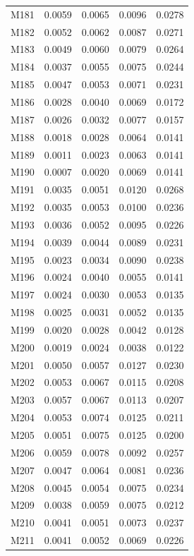 \begin{longtable}{lrrrr}
M181 & 0.0059 & 0.0065 & 0.0096 & 0.0278 \\
M182 & 0.0052 & 0.0062 & 0.0087 & 0.0271 \\
M183 & 0.0049 & 0.0060 & 0.0079 & 0.0264 \\
M184 & 0.0037 & 0.0055 & 0.0075 & 0.0244 \\
M185 & 0.0047 & 0.0053 & 0.0071 & 0.0231 \\
M186 & 0.0028 & 0.0040 & 0.0069 & 0.0172 \\
M187 & 0.0026 & 0.0032 & 0.0077 & 0.0157 \\
M188 & 0.0018 & 0.0028 & 0.0064 & 0.0141 \\
M189 & 0.0011 & 0.0023 & 0.0063 & 0.0141 \\
M190 & 0.0007 & 0.0020 & 0.0069 & 0.0141 \\
M191 & 0.0035 & 0.0051 & 0.0120 & 0.0268 \\
M192 & 0.0035 & 0.0053 & 0.0100 & 0.0236 \\
M193 & 0.0036 & 0.0052 & 0.0095 & 0.0226 \\
M194 & 0.0039 & 0.0044 & 0.0089 & 0.0231 \\
M195 & 0.0023 & 0.0034 & 0.0090 & 0.0238 \\
M196 & 0.0024 & 0.0040 & 0.0055 & 0.0141 \\
M197 & 0.0024 & 0.0030 & 0.0053 & 0.0135 \\
M198 & 0.0025 & 0.0031 & 0.0052 & 0.0135 \\
M199 & 0.0020 & 0.0028 & 0.0042 & 0.0128 \\
M200 & 0.0019 & 0.0024 & 0.0038 & 0.0122 \\
M201 & 0.0050 & 0.0057 & 0.0127 & 0.0230 \\
M202 & 0.0053 & 0.0067 & 0.0115 & 0.0208 \\
M203 & 0.0057 & 0.0067 & 0.0113 & 0.0207 \\
M204 & 0.0053 & 0.0074 & 0.0125 & 0.0211 \\
M205 & 0.0051 & 0.0075 & 0.0125 & 0.0200 \\
M206 & 0.0059 & 0.0078 & 0.0092 & 0.0257 \\
M207 & 0.0047 & 0.0064 & 0.0081 & 0.0236 \\
M208 & 0.0045 & 0.0054 & 0.0075 & 0.0234 \\
M209 & 0.0038 & 0.0059 & 0.0075 & 0.0212 \\
M210 & 0.0041 & 0.0051 & 0.0073 & 0.0237 \\
M211 & 0.0041 & 0.0052 & 0.0069 & 0.0226 \\

\end{longtable}

